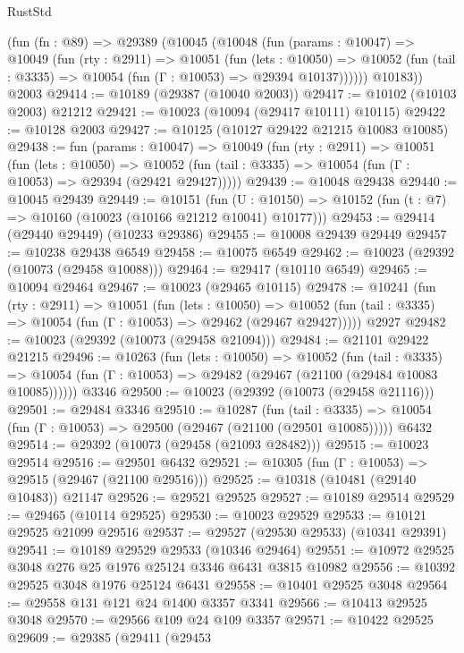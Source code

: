 \begin{lexlean}{RustStd}
\begin{coremodule}
    (fun (fn : @89) =>
    @29389
      (@10045
        (@10048
          (fun (params : @10047) =>
          @10049
            (fun (rty : @2911) =>
            @10051
              (fun (lets : @10050) =>
              @10052 (fun (tail : @3335) => @10054 (fun (Γ : @10053) => @29394 @10137))))))
        @10183))
    @2003
@29414 := @10189 (@29387 (@10040 @2003))
@29417 := @10102 (@10103 @2003) @21212
@29421 := @10023 (@10094 (@29417 @10111) @10115)
@29422 := @10128 @2003
@29427 := @10125 (@10127 @29422 @21215 @10083 @10085)
@29438 := fun (params : @10047) =>
  @10049
    (fun (rty : @2911) =>
    @10051
      (fun (lets : @10050) =>
      @10052 (fun (tail : @3335) => @10054 (fun (Γ : @10053) => @29394 (@29421 @29427)))))
@29439 := @10048 @29438
@29440 := @10045 @29439
@29449 := @10151
    (fun (U : @10150) => @10152 (fun (t : @7) => @10160 (@10023 (@10166 @21212 @10041) @10177)))
@29453 := @29414 (@29440 @29449) (@10233 @29386)
@29455 := @10008 @29439 @29449
@29457 := @10238 @29438 @6549
@29458 := @10075 @6549
@29462 := @10023 (@29392 (@10073 (@29458 @10088)))
@29464 := @29417 (@10110 @6549)
@29465 := @10094 @29464
@29467 := @10023 (@29465 @10115)
@29478 := @10241
    (fun (rty : @2911) =>
    @10051
      (fun (lets : @10050) =>
      @10052 (fun (tail : @3335) => @10054 (fun (Γ : @10053) => @29462 (@29467 @29427)))))
    @2927
@29482 := @10023 (@29392 (@10073 (@29458 @21094)))
@29484 := @21101 @29422 @21215
@29496 := @10263
    (fun (lets : @10050) =>
    @10052
      (fun (tail : @3335) =>
      @10054 (fun (Γ : @10053) => @29482 (@29467 (@21100 (@29484 @10083 @10085))))))
    @3346
@29500 := @10023 (@29392 (@10073 (@29458 @21116)))
@29501 := @29484 @3346
@29510 := @10287
    (fun (tail : @3335) => @10054 (fun (Γ : @10053) => @29500 (@29467 (@21100 (@29501 @10085)))))
    @6432
@29514 := @29392 (@10073 (@29458 (@21093 @28482)))
@29515 := @10023 @29514
@29516 := @29501 @6432
@29521 := @10305 (fun (Γ : @10053) => @29515 (@29467 (@21100 @29516)))
@29525 := @10318 (@10481 (@29140 @10483)) @21147
@29526 := @29521 @29525
@29527 := @10189 @29514
@29529 := @29465 (@10114 @29525)
@29530 := @10023 @29529
@29533 := @10121 @29525 @21099 @29516
@29537 := @29527 (@29530 @29533) (@10341 @29391)
@29541 := @10189 @29529 @29533 (@10346 @29464)
@29551 := @10972 @29525 @3048 @276 @25 @1976 @25124 @3346 @6431 @3815 @10982
@29556 := @10392 @29525 @3048 @1976 @25124 @6431
@29558 := @10401 @29525 @3048
@29564 := @29558 @131 @121 @24 @1400 @3357 @3341
@29566 := @10413 @29525 @3048
@29570 := @29566 @109 @24 @109 @3357
@29571 := @10422 @29525
@29609 := @29385
    (@29411
      (@29453

\end{coremodule}
\end{lexlean}
